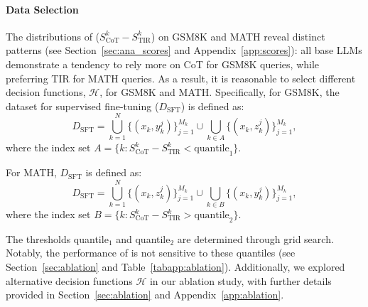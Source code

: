 \paragraph{Data Selection}
The distributions of ($S_{\text{CoT}}^k - S_{\text{TIR}}^k$) on GSM8K and MATH reveal distinct patterns (see Section~\ref{sec:ana_scores} and Appendix~\ref{app:scores}): all base LLMs demonstrate a tendency to rely more on CoT for GSM8K queries, while preferring TIR for MATH queries. 
As a result, it is reasonable to select different decision functions, $\mathcal{H}$, for GSM8K and MATH.
Specifically, for GSM8K, the dataset for supervised fine-tuning ($D_{\text{SFT}}$) is defined as:  
$$
D_{\text{SFT}} = \bigcup_{k=1}^N \{(x_k, y_k^j)\}_{j=1}^{M_k} \cup \bigcup_{k \in A} \{(x_k, z_k^j)\}_{j=1}^{M_k},
$$  
where the index set $A = \{k: S_{\text{CoT}}^k - S_{\text{TIR}}^k < \text{quantile}_1\}$.  

For MATH, $D_{\text{SFT}}$ is defined as:  
$$
D_{\text{SFT}} = \bigcup_{k=1}^N \{(x_k, z_k^j)\}_{j=1}^{M_k} \cup \bigcup_{k \in B} \{(x_k, y_k^j)\}_{j=1}^{M_k},
$$  
where the index set $B = \{k: S_{\text{CoT}}^k - S_{\text{TIR}}^k > \text{quantile}_2\}$.  

The thresholds quantile$_1$ and quantile$_2$ are determined through grid search. 
Notably, the performance of {\method} is not sensitive to these quantiles (see Section~\ref{sec:ablation} and Table~\ref{tabapp:ablation}). 
Additionally, we explored alternative decision functions $\mathcal{H}$ in our ablation study, with further details provided in Section~\ref{sec:ablation} and Appendix~\ref{app:ablation}.





